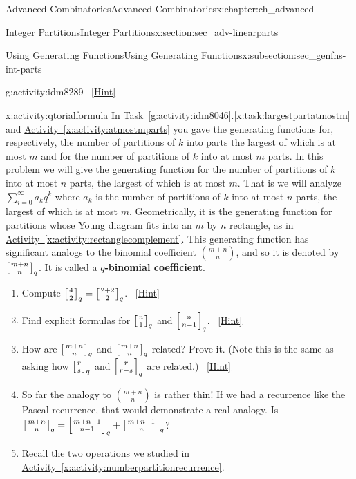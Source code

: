 \documentclass[oneside,10pt,]{book}
\newcommand{\terminology}[1]{\textbf{#1}}
\numberwithin{equation}{chapter}
\newcommand{\qchoose}[2]{\left[{#1\atop#2}\right]_q}
\begin{document}
\begin{chapterptx}{Advanced Combinatorics}{}{Advanced Combinatorics}{}{}{x:chapter:ch_advanced}
\begin{sectionptx}{Integer Partitions}{}{Integer Partitions}{}{}{x:section:sec_adv-linearparts}
\begin{subsectionptx}{Using Generating Functions}{}{Using Generating Functions}{}{}{x:subsection:sec_genfns-int-parts}
\begin{activity}{}{g:activity:idm8289}
\qquad~\hfill{\tiny\hyperlink{g:hint:idm8294-back}{[Hint]}}\end{activity}
\begin{activity}{}{x:activity:qtorialformula}%
In \hyperref[x:task:largestpartatmostm]{Task~\ref{g:activity:idm8046}.\ref{x:task:largestpartatmostm}} and \hyperref[x:activity:atmostmparts]{Activity~\ref{x:activity:atmostmparts}} you gave the generating functions for, respectively, the number of partitions of \(k\) into parts the largest of which is at most \(m\) and for the number of partitions of \(k\) into at most \(m\) parts. In this problem we will give the generating function for the number of partitions of \(k\) into at most \(n\) parts, the largest of which is at most \(m\). That is we will analyze \(\sum_{i=0}^\infty a_kq^k\) where \(a_k\) is the number of partitions of \(k\) into at most \(n\) parts, the largest of which is at most \(m\). Geometrically, it is the generating function for partitions whose Young diagram fits into an \(m\) by \(n\) rectangle, as in \hyperref[x:activity:rectanglecomplement]{Activity~\ref{x:activity:rectanglecomplement}}. This generating function has significant analogs to the binomial coefficient \(\binom{m+n}{n}\), and so it is denoted by \(\qchoose{m+n}{n}\). It is called a \terminology{\(q\)-binomial coefficient}.%
\begin{enumerate}[font=\bfseries,label=(\alph*),ref=\alph*]
\item{}Compute \(\qchoose{4}{2}=\qchoose{2+2}{2}\).%
\qquad~\hfill{\tiny\hyperlink{g:hint:idm8342-back}{[Hint]}}\item{}Find explicit formulas for \(\qchoose{n}{1}\) and \(\qchoose{n}{n-1}\).%
\qquad~\hfill{\tiny\hyperlink{g:hint:idm8352-back}{[Hint]}}\item{}How are \(\qchoose{m+n}{n}\) and \(\qchoose{m+n}{n}\) related? Prove it. (Note this is the same as asking how \(\qchoose{r}{s}\) and \(\qchoose{r}{r-s}\) are related.)%
\qquad~\hfill{\tiny\hyperlink{g:hint:idm8368-back}{[Hint]}}\item{}So far the analogy to \(\binom{m+n}{n}\) is rather thin! If we had a recurrence like the Pascal recurrence, that would demonstrate a real analogy. Is \(\qchoose{m+n}{n}= \qchoose{m+n-1}{n-1}+\qchoose{m+n-1}{n}\)?%
\item{}Recall the two operations we studied in \hyperref[x:activity:numberpartitionrecurrence]{Activity~\ref{x:activity:numberpartitionrecurrence}}.%
\begin{enumerate}[font=\bfseries,label=(\roman*),ref=\theenumi.\roman*]

\end{enumerate}
\end{enumerate}
\end{activity}
\end{subsectionptx}
\end{sectionptx}
\end{chapterptx}
\end{document}
